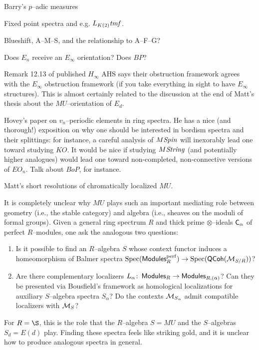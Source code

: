 Barry's $p$--adic measures

Fixed point spectra and e.g. $L_{K(2)} \mathit{tmf}$.

Blueshift, A--M--S, and the relationship to A--F--G?

Does $E_n$ receive an $E_\infty$ orientation?  Does $BP$?

Remark 12.13 of published $H_\infty$ AHS says their obstruction framework agrees with the $E_\infty$ obstruction framework (if you take everything in sight to have $E_\infty$ structures).  This is almost certainly related to the discussion at the end of Matt's thesis about the $MU$--orientation of $E_d$.

Hovey's paper on $v_n$--periodic elements in ring spectra.  He has a nice (and thorough!) exposition on why one should be interested in bordism spectra and their splittings: for instance, a careful analysis of $M\mathit{Spin}$ will inexorably lead one toward studying $KO$.  It would be nice if studying $M\mathit{String}$ (and potentially higher analogues) would lead one toward non-completed, non-connective versions of $EO_n$.  Talk about $BoP$, for instance.

Matt's short resolutions of chromatically localized $MU$.






\begin{remark}
It is completely unclear why $MU$ plays such an important mediating role between geometry (i.e., the stable category) and algebra (i.e., sheaves on the moduli of formal groups).  Given a general ring spectrum $R$ and thick prime $\otimes$--ideals $\mathsf{C}_\alpha$ of perfect $R$--modules, one ask the analogous two questions:
\begin{enumerate}
\item Is it possible to find an $R$--algebra $S$ whose context functor induces a homeomorphism of Balmer spectra $\operatorname{Spec}(\mathsf{Modules}_R^{\mathrm{perf}}) \to \operatorname{Spec}(\mathsf{QCoh}(\mathcal{M}_{S/R}))$?
\item Are there complementary localizers $L_\alpha\colon\thinspace \mathsf{Modules}_R \to \mathsf{Modules}_{R,(\alpha)}$?  Can they be presented via Bousfield's framework as homological localizations for auxiliary $S$--algebra spectra $S_\alpha$?  Do the contexts $\mathcal{M}_{S_\alpha}$ admit compatible localizers with $\mathcal{M}_{S}$?
\end{enumerate}
For $R = \S$, this is the role that the $R$--algebra $S = MU$ and the $S$--algebras $S_d = E(d)$ play.  Finding these spectra feels like striking gold, and it is unclear how to produce analogous spectra in general.
\end{remark}




